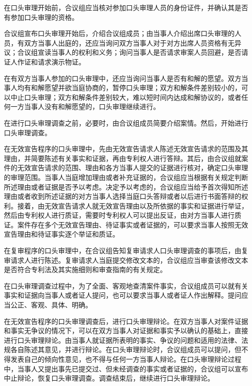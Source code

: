 在口头审理开始前，合议组应当核对参加口头审理人员的身份证件，并确认其是否有参加口头审理的资格。

合议组宣布口头审理开始后，介绍合议组成员；由当事人介绍出席口头审理的人员，有双方当事人出庭的，还应当询问双方当事人对于对方出席人员资格有无异议；合议组宣读当事人的权利和义务；询问当事人是否请求审案人员回避，是否请证人作证和请求演示物证。

在有双方当事人参加的口头审理中，还应当询问当事人是否有和解的愿望。双方当事人均有和解愿望并欲当庭协商的，暂停口头审理；双方和解条件差别较小的，可以中止口头审理；双方和解条件差别较大，难以短时间内达成和解协议的，或者任何一方当事人没有和解愿望的，口头审理继续进行。

在进行口头审理调查之前，必要时，由合议组成员简要介绍案情。然后，开始进行口头审理调查。

在无效宣告程序的口头审理中，先由无效宣告请求人陈述无效宣告请求的范围及其理由，并简要陈述有关事实和证据，再由专利权人进行答辩。其后，由合议组就案件的无效宣告请求的范围、理由和各方当事人提交的证据进行核对，确定口头审理的审理范围。当事人当庭增加理由或者补充证据的，合议组应当根据有关规定判断所述理由或者证据是否予以考虑。决定予以考虑的，合议组应当给予首次得知所述理由或者收到所述证据的对方当事人选择当庭口头答辩或者以后进行书面答辩的权利。接着，由无效宣告请求人就无效宣告理由以及所依据的事实和证据进行举证，然后由专利权人进行质证，需要时专利权人可以提出反证，由对方当事人进行质证。案件存在多个无效宣告理由、待证事实或者证据的，可以要求当事人按照无效宣告理由和待证事实逐个举证和质证。

在复审程序的口头审理中，在合议组告知复审请求人口头审理调查的事项后，由复审请求人进行陈述。复审请求人当庭提交修改文本的，合议组应当审查该修改文本是否符合专利法及其实施细则和审查指南的有关规定。

在口头审理调查过程中，为了全面、客观地查清案件事实，合议组成员可以就有关事实和证据向当事人或者证人提问，也可以要求当事人或者证人作出解释。提问应当公正、客观、具体、明确。

在无效宣告程序的口头审理调查后，进行口头审理辩论。在双方当事人对案件证据和事实无争议的情况下，可以在双方当事人对证据和事实予以确认的基础上，直接进行口头审理辩论。由当事人就证据所表明的事实、争议的问题和适用的法律、法规各自陈述其意见，并进行辩论。在口头审理辩论时，合议组成员可以提问，但不得发表自己的倾向性意见，也不得与任何一方当事人辩论。在口头审理辩论过程中，当事人又提出事先已提交过、但未经调查的事实或者证据的，合议组可以宣布中止辩论，恢复口头审理调查。调查结束后，继续进行口头审理辩论。

